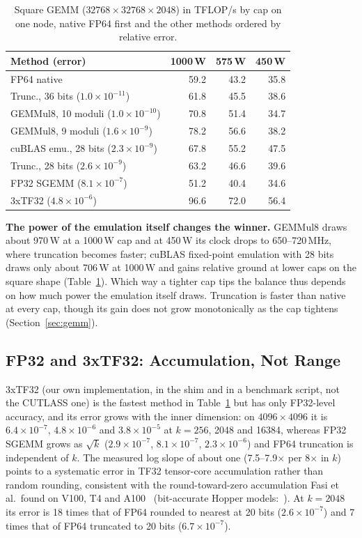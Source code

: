 \documentclass[conference]{IEEEtran}
\newcommand{\W}{\,W}
\newcommand{\ee}[2]{#1{\times}10^{#2}}  %
\begin{document}
\begin{table}[t]
\caption{Square GEMM ($32768{\times}32768{\times}2048$) in TFLOP/s by cap on one node, native FP64 first and the
other methods ordered by relative error.}\label{tab:methods}
\centering\footnotesize\setlength{\tabcolsep}{4pt}
\begin{tabular}{@{}lrrr@{}}
\toprule
Method (error) & 1000\W & 575\W & 450\W \\
\midrule
FP64 native & 59.2 & 43.2 & 35.8 \\
Trunc., 36 bits ($\ee{1.0}{-11}$) & 61.8 & 45.5 & 38.6 \\
GEMMul8, 10 moduli ($\ee{1.0}{-10}$) & 70.8 & 51.4 & 34.7 \\
GEMMul8, 9 moduli ($\ee{1.6}{-9}$) & 78.2 & 56.6 & 38.2 \\
cuBLAS emu., 28 bits ($\ee{2.3}{-9}$) & 67.8 & 55.2 & 47.5 \\
Trunc., 28 bits ($\ee{2.6}{-9}$) & 63.2 & 46.6 & 39.6 \\
FP32 SGEMM ($\ee{8.1}{-7}$) & 51.2 & 40.4 & 34.6 \\
3xTF32 ($\ee{4.8}{-6}$) & 96.6 & 72.0 & 56.4 \\
\bottomrule
\end{tabular}
\end{table}

\textbf{The power of the emulation itself changes the winner.} GEMMul8 draws about 970\W{} at a 1000\W{} cap and at
450\W{} its clock drops to 650--720\,MHz, where truncation becomes faster; cuBLAS fixed-point emulation with 28 bits draws only
about 706\W{} at 1000\W{} and gains relative ground at lower caps on the square shape (Table~\ref{tab:methods}).
Which way a tighter cap tips the balance thus depends on how much power the emulation itself draws. Truncation is
faster than native at every cap, though its gain does not grow monotonically as the cap tightens
(Section~\ref{sec:gemm}).

\subsection{FP32 and 3xTF32: Accumulation, Not Range}\label{sec:fp32}

3xTF32 (our own implementation, in the shim and in a benchmark script, not the CUTLASS one) is the fastest method in
Table~\ref{tab:methods} but has only FP32-level accuracy, and its error grows with the inner dimension: on $4096{\times}4096$ it is $\ee{6.4}{-7}$, $\ee{4.8}{-6}$ and $\ee{3.8}{-5}$ at $k=256$, 2048 and
16384, whereas FP32 SGEMM grows as $\sqrt{k}$ ($\ee{2.9}{-7}$, $\ee{8.1}{-7}$, $\ee{2.3}{-6}$) and FP64 truncation
is independent of $k$. The measured log slope of about one (7.5--7.9$\times$ per 8$\times$ in $k$) points to a
systematic error in TF32 tensor-core accumulation rather than random rounding, consistent with the round-toward-zero
accumulation Fasi et al.\ found on V100, T4 and A100~\cite{Fasi2021} (bit-accurate Hopper models:~\cite{Khattak2025}).
At $k=2048$ its error is 18 times that of FP64 rounded to nearest at 20 bits ($\ee{2.6}{-7}$) and 7 times that of
FP64 truncated to 20 bits ($\ee{6.7}{-7}$).
\end{document}
